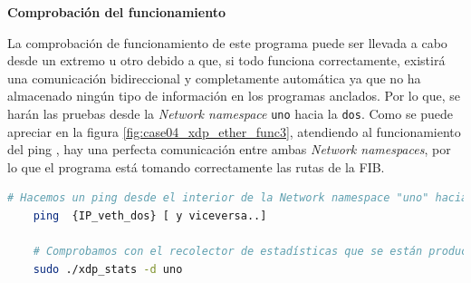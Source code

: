 \vspace{1cm}

\textbf{Comprobación del funcionamiento}\\
\par
La comprobación de funcionamiento de este programa puede ser llevada a cabo desde un extremo u otro debido a que, si todo funciona correctamente, existirá una comunicación bidireccional y completamente automática ya que no ha almacenado ningún tipo de información en los programas anclados. Por lo que, se harán las pruebas desde la \textit{Network namespace} \texttt{uno} hacia la \texttt{dos}. Como se puede apreciar en la figura \ref{fig:case04_xdp_ether_func3}, atendiendo al funcionamiento del ping \hspace{1mm}, hay una perfecta comunicación entre ambas \textit{Network namespaces}, por lo que el programa está tomando correctamente las rutas de la FIB. \\

\begin{lstlisting}[language= bash, style=Consola, caption={Comprobación del funcionamiento Forwarding auto - Case04},label=code:case04_xdp_ether_func3]
    # Hacemos un ping desde el interior de la Network namespace "uno" hacia la veth0 de la Network namespace "dos"
    ping  {IP_veth_dos} [ y viceversa..]
    
    # Comprobamos con el recolector de estadísticas que se están produciendo XDP_REDIRECT
    sudo ./xdp_stats -d uno

\end{lstlisting}

\newpage

